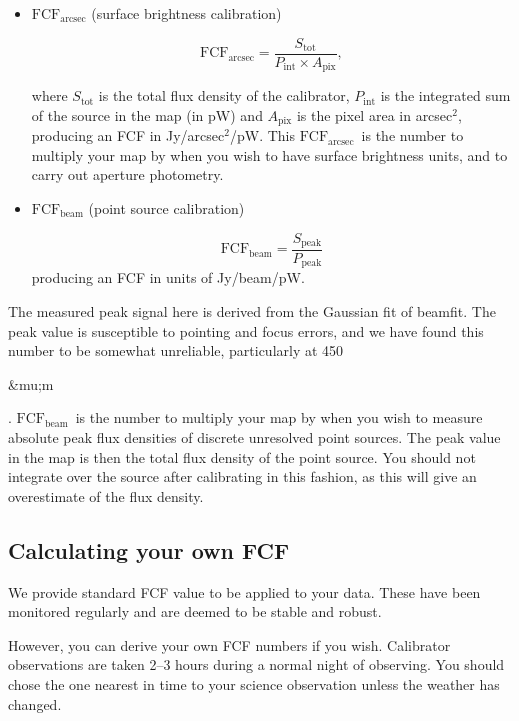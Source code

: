 \documentclass[twoside,11pt]{article}
\newcommand{\micron}{\mbox{\,${\umu}$m}}            %
\newcounter{box}
\newcommand{\xref}[3]{#1}
\newcommand{\xlabel}[1]{}
\renewcommand{\_}{\texttt{\symbol{95}}}
\newcommand{\fcfb}{$\mathrm{FCF_{beam}}$}
\newcommand{\fcfa}{$\mathrm{FCF_{arcsec}}$}
\newcommand{\task}[1]{\textsf{#1}}
\newcommand{\beamfit}{\xref{\task{beamfit}}{sun95}{BEAMFIT}}
\renewcommand{\micron}{\begin{rawhtml}&mu;m\end{rawhtml}}
\begin{document}
\begin{itemize}

\item{\textbf{\fcfa} (surface brightness calibration)}

\begin{equation}
\label{eq:fcf_arcsec}
\mathrm{FCF_{arcsec}} = \frac{S_\mathrm{tot}}{P_\mathrm{int} \times
  A_\mathrm{pix}},
\end{equation}

where $S_\mathrm{tot}$ is the total flux density of the calibrator,
$P_\mathrm{int}$ is the integrated sum of the source in the map (in
pW) and $A_\mathrm{pix}$ is the pixel area in arcsec$^2$, producing an
FCF in Jy/arcsec$^2$/pW. This \fcfa\ is the number to
multiply your map by when you wish to have surface brightness units,
and to carry out aperture photometry.

\item{\textbf{\fcfb} (point source calibration)}

\begin{equation}
\label{eq:fcf_beam}
\mathrm{FCF_{beam}} = \frac{S_\mathrm{{peak}}}{P_\mathrm{peak}}
\end{equation}
producing an FCF in units of Jy/beam/pW.
\end{itemize}

The measured peak signal here is derived from the Gaussian fit of
\beamfit. The peak value is susceptible to pointing and focus errors,
and we have found this number to be somewhat unreliable, particularly
at 450\micron. \fcfb\ is the number to multiply your
map by when you wish to measure absolute peak flux densities of
discrete unresolved point sources. The peak value in the map is then
the total flux density of the point source. You should not integrate
over the source after calibrating in this fashion, as this will give
an overestimate of the flux density.


\subsection{\xlabel{ownfcf}Calculating your own FCF}

We provide standard FCF value to be applied to your data. These have been monitored regularly and are deemed to be stable and robust. 

However, you can derive your own FCF numbers if you wish. Calibrator observations are taken 2--3 hours during a normal night of observing. You should chose the one nearest in time to your science observation unless the weather has changed. 
\end{document}
